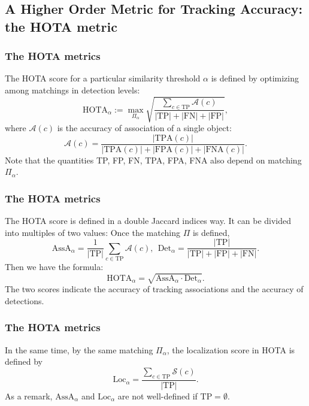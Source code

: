 \documentclass[slidetop, mathserif]{beamer}
\begin{document}
\subsection{A Higher Order Metric for Tracking Accuracy: the HOTA metric}

\begin{frame}
    \frametitle{The HOTA metrics}

    The HOTA score for a particular similarity threshold $\alpha$ is defined by
    optimizing among matchings in detection levels:
    \[
        \text{HOTA}_\alpha := 
        \max_{\Pi_\alpha} \sqrt{\dfrac{\sum_{c\in\text{TP}} \mathcal A(c) }{|\text{TP}|+|\text{FN}|+|\text{FP}|}},
    \]
    where $\mathcal A(c)$ is the accuracy of association of a single object:
    \[
        \mathcal A(c) = \dfrac{|\text{TPA}(c)|}{|\text{TPA}(c)|+|\text{FPA}(c)|+|\text{FNA}(c)|}.
    \]
    Note that the quantities TP, FP, FN, TPA, FPA, FNA also depend on matching $\Pi_\alpha$.

\end{frame}

\begin{frame}
    \frametitle{The HOTA metrics}
    The HOTA score is defined in a double Jaccard indices way.
    It can be divided into multiples of two values:
    Once the matching $\Pi$ is defined,
    \[
        \text{AssA}_\alpha = \dfrac{1}{|\text{TP}|} \sum_{c\in\text{TP}} \mathcal A(c), \ \ 
        \text{Det}_\alpha = \dfrac{|\text{TP}|}{|\text{TP}| + |\text{FP}| + |\text{FN}|}.
    \]
    Then we have the formula:
    \[
        \text{HOTA}_\alpha = \sqrt{\text{AssA}_\alpha \cdot \text{Det}_\alpha}.
    \]
    The two scores indicate the accuracy of tracking associations and the accuracy of detections.
\end{frame}

\begin{frame}
    \frametitle{The HOTA metrics}

    In the same time, by the same matching $\Pi_\alpha$,
    the localization score in HOTA is defined by
    \[
        \text{Loc}_\alpha = \dfrac{\sum_{c\in\text{TP}} \mathcal S(c)}{|\text{TP}|}.
    \]
    As a remark, $\text{AssA}_\alpha$ and $\text{Loc}_\alpha$ are not well-defined
    if $\text{TP} = \emptyset$.

\end{frame}
\end{document}
